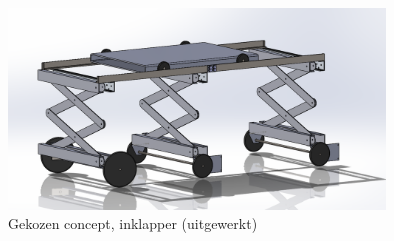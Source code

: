 \begin{figure}[h]
    \centering
    \includegraphics[width = 100mm]{04_gekozenconcept/eindconcept.png}
    \caption{Gekozen concept, inklapper (uitgewerkt)}
    \label{fig:uiteindelijke_concept}
\end{figure}